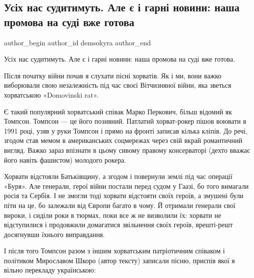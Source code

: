  
 
 
 
 

\subsection{Усіх нас судитимуть. Але є і гарні новини: наша промова на суді вже готова}
\label{sec:20_01_2023.fb.demsokyra.1.us_kh_nas_suditimut_}

\ifcmt
 author_begin
   author_id demsokyra
 author_end
\fi

Усіх нас судитимуть. Але є і гарні новини: наша промова на суді вже готова.

Після початку війни почав я слухати пісні хорватів. Як і ми, вони важко
виборювали свою незалежність під час своєї Вітчизняної війни, яка зветься
хорватською «Domovinski rat».

Є такий популярний хорватський співак Марко Перкович, більш відомий як Томпсон.
Томпсон — це його позивний. Патлатий хорват-рокер пішов воювати в 1991 році,
узяв у руки Томпсон і прямо на фронті записав кілька кліпів. До речі, згодом
став мемом в американських соцмережах через свій вкрай романтичний вигляд.
Важко зараз впізнати в цьому сивому правому консерваторі (дехто вважає його
навіть фашистом) молодого рокера.

Хорвати відстояли Батьківщину, а згодом і повернули землі під час операції
«Буря». Але генерали, герої війни постали перед судом у Гаазі, бо того вимагали
росія та Сербія. І не змогли тоді хорвати відстояти своїх героїв, а змушені
були піти на це, бо залежали від Європи багато в чому. Й отримали генерали свої
вироки, і сиділи роки в тюрмах, поки все ж не визволили їх: хорвати не
відступилися і продовжили домагатися звільнення своїх героїв, врешті-решт
досягнувши їхнього виправдання.

І після того Томпсон разом з іншим хорватським патріотичним співаком і
політиком Мирославом Шкоро (автор тексту) записали пісню, приспів якої я вільно
перекладу українською:

